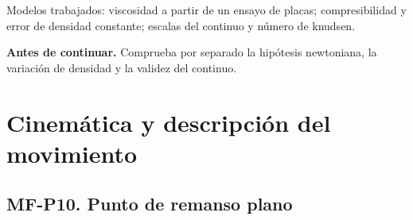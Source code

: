 \begin{tcolorbox}[studiumcheck,breakable=false,title={Síntesis y comprobación}]Modelos trabajados: viscosidad a partir de un ensayo de placas; compresibilidad y error de densidad constante; escalas del continuo y número de knudsen.\par\textbf{Antes de continuar.} Comprueba por separado la hipótesis newtoniana, la variación de densidad y la validez del continuo.\end{tcolorbox}

\chapter{Cinemática y descripción del movimiento}


\Needspace{.30\textheight}\section{MF-P10. Punto de remanso plano}

